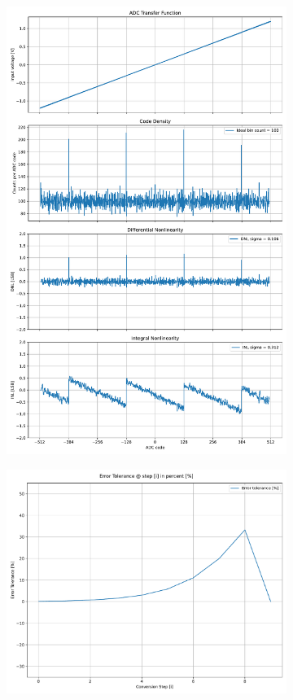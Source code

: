 \documentclass[varwidth]{standalone}
\begin{document}
\begin{figure}
\begin{subfigure}{0.32\textwidth}
    \includegraphics[width=\textwidth]{behavioral_10b_noisy_postconv_nonlinearity.pdf}
\end{subfigure}
\begin{subfigure}{0.32\textwidth}
    \includegraphics[width=\textwidth]{behavioral_10b_noisy_postconv_redundancy.pdf}

\end{subfigure}
\end{figure}
\end{document}
